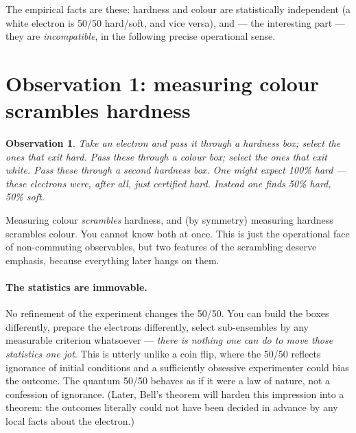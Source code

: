 \documentclass[11pt,a4paper]{article}
\newtheorem{obs}{Observation}
\theoremstyle{remark}
\begin{document}
The empirical facts are these: hardness and colour are statistically independent
(a white electron is 50/50 hard/soft, and vice versa), and --- the interesting part ---
they are \emph{incompatible}, in the following precise operational sense.

\section{Observation 1: measuring colour scrambles hardness}

\begin{obs}
Take an electron and pass it through a hardness box; select the ones that exit
\emph{hard}. Pass these through a colour box; select the ones that exit
\emph{white}. Pass these through a second hardness box. One might expect
100\% \emph{hard} --- these electrons were, after all, just certified hard.
Instead one finds 50\% hard, 50\% soft.
\end{obs}

\begin{center}
\end{center}

Measuring colour \emph{scrambles} hardness, and (by symmetry) measuring hardness
scrambles colour. You cannot know both at once. This is just the operational face of
non-commuting observables, but two features of the scrambling deserve emphasis,
because everything later hangs on them.

\paragraph{The statistics are immovable.}
No refinement of the experiment changes the 50/50. You can build the boxes
differently, prepare the electrons differently, select sub-ensembles by any
measurable criterion whatsoever --- \emph{there is nothing one can do to move those
statistics one jot}. This is utterly unlike a coin flip, where the 50/50 reflects
ignorance of initial conditions and a sufficiently obsessive experimenter could
bias the outcome. The quantum 50/50 behaves as if it were a law of nature, not a
confession of ignorance. (Later, Bell's theorem will harden this impression into
a theorem: the outcomes literally could not have been decided in advance by any
local facts about the electron.)
\end{document}
